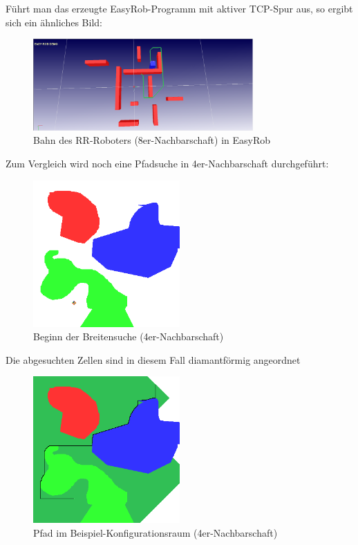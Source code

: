 \documentclass[11pt, a4paper]{article}
\begin{document}
Führt man das erzeugte EasyRob-Programm mit aktiver TCP-Spur aus, so ergibt sich ein ähnliches Bild:

\begin{figure}[H]
	\center\includegraphics[width=0.75\textwidth]{prismatic.png}
	\caption{Bahn des RR-Roboters (8er-Nachbarschaft) in EasyRob}
\end{figure}

Zum Vergleich wird noch eine Pfadsuche in 4er-Nachbarschaft durchgeführt:

\begin{figure}[H]
	\center
	\includegraphics[width=0.5\textwidth,frame,viewport=75 35 125 85, clip]{../Termin6/Termin6/cspace_bfs_start_4nb.png}
	\caption{Beginn der Breitensuche (4er-Nachbarschaft)}
\end{figure}

Die abgesuchten Zellen sind in diesem Fall diamantförmig angeordnet

\begin{figure}[H]
	\center\includegraphics[width=0.5\textwidth,frame]{../Termin6/Termin6/cspace_bfs_4nb.png}
	\caption{Pfad im Beispiel-Konfigurationsraum (4er-Nachbarschaft)}
\end{figure}
\end{document}

